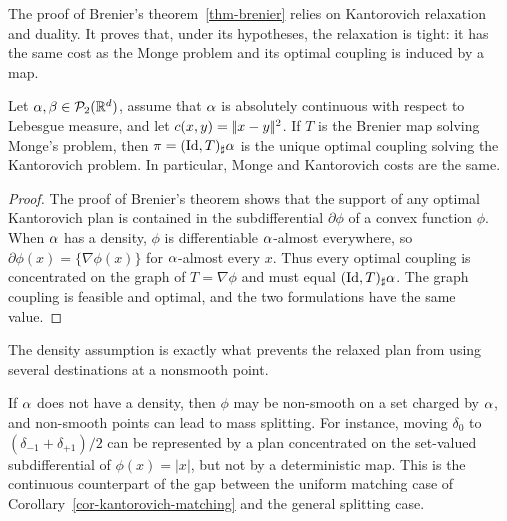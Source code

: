 The proof of Brenier's theorem~\ref{thm-brenier} relies on Kantorovich relaxation and duality. It proves that, under its hypotheses, the relaxation is tight: it has the same cost as the Monge problem and its optimal coupling is induced by a map.

\begin{cor}\label{cor-monge-kantorovich-brenier}
		Let $\alpha,\beta\in\mathcal{P}_2(\mathbb{R}^d)$, assume that $\alpha$ is absolutely continuous with respect to Lebesgue measure, and let $c(x,y)=|\!| x-y |\!|^2$. If $T$ is the Brenier map solving Monge's problem, then $\pi=(\mathrm{Id},T)_\sharp\alpha$ is the unique optimal coupling solving the Kantorovich problem. In particular, Monge and Kantorovich costs are the same.
\end{cor}
\begin{proof}
	The proof of Brenier's theorem shows that the support of any optimal Kantorovich plan is contained in the subdifferential $\partial\phi$ of a convex function $\phi$. When $\alpha$ has a density, $\phi$ is differentiable $\alpha$-almost everywhere, so $\partial\phi(x)=\{\nabla\phi(x)\}$ for $\alpha$-almost every $x$. Thus every optimal coupling is concentrated on the graph of $T=\nabla\phi$ and must equal $(\mathrm{Id},T)_\sharp\alpha$. The graph coupling is feasible and optimal, and the two formulations have the same value.
\end{proof}

The density assumption is exactly what prevents the relaxed plan from using several destinations at a nonsmooth point.

\begin{rem}
	If $\alpha$ does not have a density, then $\phi$ may be non-smooth on a set charged by $\alpha$, and non-smooth points can lead to mass splitting. For instance, moving $\delta_0$ to $(\delta_{-1}+\delta_{+1})/2$ can be represented by a plan concentrated on the set-valued subdifferential of $\phi(x)=|x|$, but not by a deterministic map. This is the continuous counterpart of the gap between the uniform matching case of Corollary~\ref{cor-kantorovich-matching} and the general splitting case.
\end{rem}

